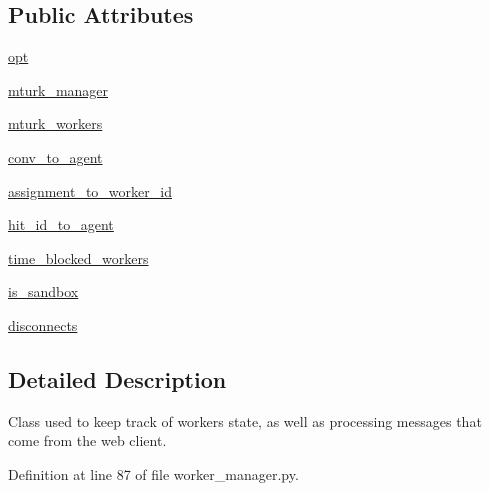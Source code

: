 \subsection*{Public Attributes}
\begin{DoxyCompactItemize}
\item 
\hyperlink{classparlai_1_1mturk_1_1core_1_1worker__manager_1_1WorkerManager_a69b6fcf739bcdaf914fe524772738309}{opt}
\item 
\hyperlink{classparlai_1_1mturk_1_1core_1_1worker__manager_1_1WorkerManager_a90e4c41010915289fa5e8e1fb0572623}{mturk\+\_\+manager}
\item 
\hyperlink{classparlai_1_1mturk_1_1core_1_1worker__manager_1_1WorkerManager_a52976ae5dca085ae8398305c36e781b9}{mturk\+\_\+workers}
\item 
\hyperlink{classparlai_1_1mturk_1_1core_1_1worker__manager_1_1WorkerManager_a878a7bb6afd1530ecc8cc8852a8990a6}{conv\+\_\+to\+\_\+agent}
\item 
\hyperlink{classparlai_1_1mturk_1_1core_1_1worker__manager_1_1WorkerManager_ad3bec2328ee19706027d1279e5910a22}{assignment\+\_\+to\+\_\+worker\+\_\+id}
\item 
\hyperlink{classparlai_1_1mturk_1_1core_1_1worker__manager_1_1WorkerManager_abff39f43090e885a3c8b74f4fcc06d55}{hit\+\_\+id\+\_\+to\+\_\+agent}
\item 
\hyperlink{classparlai_1_1mturk_1_1core_1_1worker__manager_1_1WorkerManager_aa51476aab479eae8096ae6097a8571f8}{time\+\_\+blocked\+\_\+workers}
\item 
\hyperlink{classparlai_1_1mturk_1_1core_1_1worker__manager_1_1WorkerManager_abd069a274bd03b3aeab20c3f788cf127}{is\+\_\+sandbox}
\item 
\hyperlink{classparlai_1_1mturk_1_1core_1_1worker__manager_1_1WorkerManager_a1fcba62024d92a25d76e0f106d76fd81}{disconnects}
\end{DoxyCompactItemize}


\subsection{Detailed Description}
\begin{DoxyVerb}Class used to keep track of workers state, as well as processing
messages that come from the web client.
\end{DoxyVerb}
 

Definition at line 87 of file worker\+\_\+manager.\+py.



